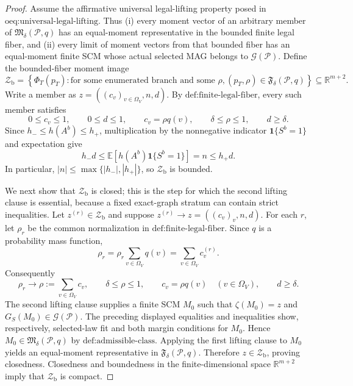 \documentclass{article}
\begin{document}
\begin{proof}
Assume the affirmative universal legal-lifting property posed in \(\text{oeq:universal-legal-lifting}\).  Thus (i) every moment vector of an arbitrary member of \(\mathfrak M_\delta(\mathcal P,q)\) has an equal-moment representative in the bounded finite legal fiber, and (ii) every limit of moment vectors from that bounded fiber has an equal-moment finite SCM whose actual selected MAG belongs to \(\mathcal G(\mathcal P)\).  Define the bounded-fiber moment image
\[
 \mathcal Z_{\mathrm b}
 =\left\{\Phi_T(p_T):
   \text{for some enumerated branch and some }\rho,
   (p_T,\rho)\in\mathfrak F_\delta(\mathcal P,q)
  \right\}\subseteq\mathbb R^{m+2}.
\]
Write a member as \(z=((c_v)_{v\in\Omega_V},n,d)\).  By \(\text{def:finite-legal-fiber}\), every such member satisfies
\[
 0\le c_v\le1,\qquad 0\le d\le1,
 \qquad c_v=\rho q(v),\qquad \delta\le\rho\le1,
 \qquad d\ge\delta.
\]
Since \(h_-\le h(A^b)\le h_+\), multiplication by the nonnegative indicator \(\mathbf 1\{S^b=1\}\) and expectation give
\[
 h_-d
 \le \mathbb E[h(A^b)\mathbf 1\{S^b=1\}]
 =n
 \le h_+d.
\]
In particular, \(|n|\le\max\{|h_-|,|h_+|\}\), so \(\mathcal Z_{\mathrm b}\) is bounded.

We next show that \(\mathcal Z_{\mathrm b}\) is closed; this is the step for which the second lifting clause is essential, because a fixed exact-graph stratum can contain strict inequalities.  Let \(z^{(r)}\in\mathcal Z_{\mathrm b}\) and suppose \(z^{(r)}\to z=((c_v)_v,n,d)\).  For each \(r\), let \(\rho_r\) be the common normalization in \(\text{def:finite-legal-fiber}\).  Since \(q\) is a probability mass function,
\[
 \rho_r
 =\rho_r\sum_{v\in\Omega_V}q(v)
 =\sum_{v\in\Omega_V}c_v^{(r)}.
\]
Consequently
\[
 \rho_r\longrightarrow
 \rho:=\sum_{v\in\Omega_V}c_v,
 \qquad \delta\le\rho\le1,
 \qquad c_v=\rho q(v)\quad(v\in\Omega_V),
 \qquad d\ge\delta.
\]
The second lifting clause supplies a finite SCM \(M_0\) such that \(\zeta(M_0)=z\) and \(G_S(M_0)\in\mathcal G(\mathcal P)\).  The preceding displayed equalities and inequalities show, respectively, selected-law fit and both margin conditions for \(M_0\).  Hence \(M_0\in\mathfrak M_\delta(\mathcal P,q)\) by \(\text{def:admissible-class}\).  Applying the first lifting clause to \(M_0\) yields an equal-moment representative in \(\mathfrak F_\delta(\mathcal P,q)\).  Therefore \(z\in\mathcal Z_{\mathrm b}\), proving closedness.  Closedness and boundedness in the finite-dimensional space \(\mathbb R^{m+2}\) imply that \(\mathcal Z_{\mathrm b}\) is compact.


\end{proof}
\end{document}
